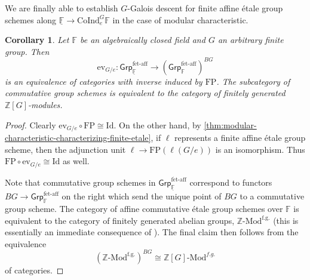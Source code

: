 \documentclass[11pt,dvipsnames]{amsart}
\newcommand{\Z}{\mathbb{Z}}
\newcommand{\F}{\mathbb{F}}
\newtheorem{corollary}[theorem]{Corollary}
\theoremstyle{BoldRemark}
\newcommand{\Coind}{\mathrm{CoInd}}
\newcommand{\FP}{\mathrm{FP}}
\newcommand{\ev}{\mathrm{ev}}
\newcommand{\fet}{\mathsf{Grp}^{\mathrm{f\acute{e}t\text{-}aff}}}
\newcommand{\Mod}{\mathrm{Mod}}
\begin{document}
We are finally able to establish $G$-Galois descent for finite affine \'{e}tale group schemes along $\underline{\F} \rightarrow \Coind_e^G \F$ in the case of modular characteristic.

\begin{corollary}\label{cor:finite-etale-group-schemes-modular-characteristic}
    Let $\F$ be an algebraically closed field and $G$ an arbitrary finite group. Then
    \[ 
        \ev_{G/e} : \fet_{\underline{\F}} \rightarrow (\fet_\F)^{BG} 
    \] 
    is an equivalence of categories with inverse induced by $\FP$. The subcategory of commutative group schemes is equivalent to the category of finitely generated $\Z[G]$-modules.
\end{corollary}

\begin{proof}
    Clearly $\ev_{G/e} \circ \FP \cong \mathrm{Id}$. On the other hand, by \cref{thm:modular-characteristic-characterizing-finite-etale}, if $\ell$ represents a finite affine \'{e}tale group scheme, then the adjunction unit $\ell \rightarrow \FP(\ell(G/e))$ is an isomorphism. Thus $\FP \circ \ev_{G/e} \cong \mathrm{Id}$ as well.

    Note that commutative group schemes in $\fet_{\underline{\F}}$ correspond to functors $BG \rightarrow \fet_\F$ on the right which send the unique point of $BG$ to a commutative group scheme. The category of affine commutative \'{e}tale group schemes over $\F$ is equivalent to the category of finitely generated abelian groups, $\Z \text{-} \Mod^{\textrm{f.g.}}$ (this is essentially an immediate consequence of \cite[Proposition 2 on page A.V.30]{Bou90}). The final claim then follows from the equivalence 
    \[ 
        ( \Z \text{-} \Mod^{\textrm{f.g.}} )^{BG} \cong \Z[G] \text{-} \Mod^{f.g.} 
    \]
    of categories.
\end{proof}



\end{document}

